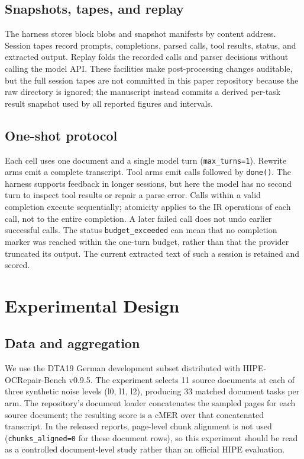 \documentclass{article}
\begin{document}
\subsection{Snapshots, tapes, and replay}
The harness stores block blobs and snapshot manifests by content address. Session tapes record prompts, completions, parsed calls, tool results, status, and extracted output. Replay folds the recorded calls and parser decisions without calling the model API. These facilities make post-processing changes auditable, but the full session tapes are not committed in this paper repository because the raw  directory is ignored; the manuscript instead commits a derived per-task result snapshot used by all reported figures and intervals.

\subsection{One-shot protocol}
Each cell uses one document and a single model turn (\texttt{max\_turns=1}). Rewrite arms emit a complete transcript. Tool arms emit calls followed by \texttt{done()}. The harness supports feedback in longer sessions, but here the model has no second turn to inspect tool results or repair a parse error. Calls within a valid completion execute sequentially; atomicity applies to the IR operations of each call, not to the entire completion. A later failed call does not undo earlier successful calls. The status \texttt{budget\_exceeded} can mean that no completion marker was reached within the one-turn budget, rather than that the provider truncated its output. The current extracted text of such a session is retained and scored.

\section{Experimental Design}
\subsection{Data and aggregation}
We use the DTA19 German development subset distributed with HIPE-OCRepair-Bench v0.9.5. The experiment selects 11 source documents at each of three synthetic noise levels (l0, l1, l2), producing 33 matched document tasks per arm. The repository's document loader concatenates the sampled pages for each source document; the resulting score is a cMER over that concatenated transcript. In the released reports, page-level chunk alignment is not used (\texttt{chunks\_aligned=0} for these document rows), so this experiment should be read as a controlled document-level study rather than an official HIPE evaluation.
\end{document}
